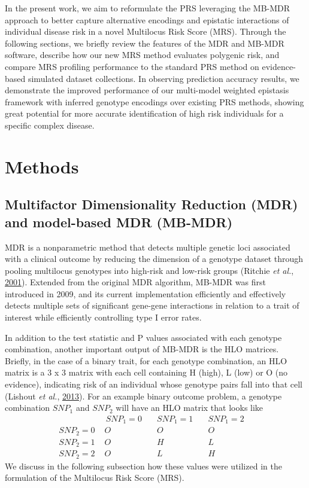 \documentclass{ws-procs11x85}
\begin{document}
In the present work, we aim to reformulate the PRS leveraging the MB-MDR
approach to better capture alternative encodings and epistatic
interactions of individual disease risk in a novel Multilocus Risk Score
(MRS). Through the following sections, we briefly review the features of
the MDR and MB-MDR software, describe how our new MRS method evaluates
polygenic risk, and compare MRS profiling performance to the standard
PRS method on evidence-based simulated dataset collections. In observing
prediction accuracy results, we demonstrate the improved performance of
our multi-model weighted epistasis framework with inferred genotype
encodings over existing PRS methods, showing great potential for more
accurate identification of high risk individuals for a specific complex
disease.

\section{Methods}
\subsection{Multifactor Dimensionality Reduction (MDR) and
model-based MDR
(MB-MDR)}\label{multifactor-dimensionality-reduction-mdr-and-model-based-mdr-mb-mdr}
MDR is a nonparametric method that detects multiple genetic loci
associated with a clinical outcome by reducing the dimension of a
genotype dataset through pooling multilocus genotypes into high-risk and
low-risk groups (Ritchie \emph{et al.},
\protect\hyperlink{ref-E26QhGxD}{2001}). Extended from the original MDR
algorithm, MB-MDR was first introduced in 2009, and its current
implementation efficiently and effectively detects multiple sets of
significant gene-gene interactions in relation to a trait of interest
while efficiently controlling type I error rates.

In addition to the test statistic and P values associated with each
genotype combination, another important output of MB-MDR is the HLO
matrices. Briefly, in the case of a binary trait, for each genotype
combination, an HLO matrix is a 3 x 3 matrix with each cell containing H
(high), L (low) or O (no evidence), indicating risk of an individual
whose genotype pairs fall into that cell (Lishout \emph{et al.},
\protect\hyperlink{ref-S6nj6BFK}{2013}). For an example binary outcome
problem, a genotype combination \(SNP_1\) and \(SNP_2\) will have an HLO
matrix that looks like \[ \begin{array}{l|ccc}
& \, SNP_1 = 0 \quad& SNP_1 = 1 \quad& SNP_1 = 2  \quad \\
\hline
SNP_2 = 0 \,\,& O        & O        & O \\
SNP_2 = 1 \,\,& O        & H        & L \\
SNP_2 = 2 \,\,& O        & L        & H
\end{array}
\] We discuss in the following subsection how these values were utilized
in the formulation of the Multilocus Risk Score (MRS).
\end{document}
